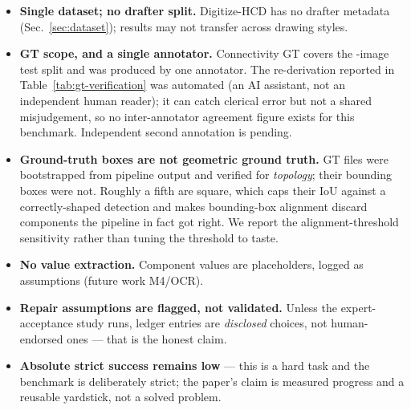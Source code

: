 \begin{itemize}
  \item \textbf{Single dataset; no drafter split.} Digitize-HCD has no
  drafter metadata (Sec.~\ref{sec:dataset}); results may not transfer
  across drawing styles. 
  \item \textbf{GT scope, and a single annotator.} Connectivity GT covers
  the \NumTestImages-image test split and was produced by one annotator.
  The re-derivation reported in Table~\ref{tab:gt-verification} was
  automated (an AI assistant, not an independent human reader); it can
  catch clerical error but not a shared misjudgement, so no
  inter-annotator agreement figure exists for this benchmark.
  Independent second annotation is pending.
  \item \textbf{Ground-truth boxes are not geometric ground truth.} GT
  files were bootstrapped from pipeline output and verified for
  \emph{topology}; their bounding boxes were not. Roughly a fifth are
  square, which caps their IoU against a correctly-shaped detection and
  makes bounding-box alignment discard components the pipeline in fact
  got right. We report the alignment-threshold sensitivity rather than
  tuning the threshold to taste. 
  \item \textbf{No value extraction.} Component values are
  placeholders, logged as assumptions (future work M4/OCR).
  \item \textbf{Repair assumptions are flagged, not validated.}
  Unless the expert-acceptance study runs, ledger entries are
  \emph{disclosed} choices, not human-endorsed ones — that is the
  honest claim.
  \item \textbf{Absolute strict success remains low} — this is a
  hard task and the benchmark is deliberately strict; the paper's
  claim is measured progress and a reusable yardstick, not a solved
  problem.
\end{itemize}

